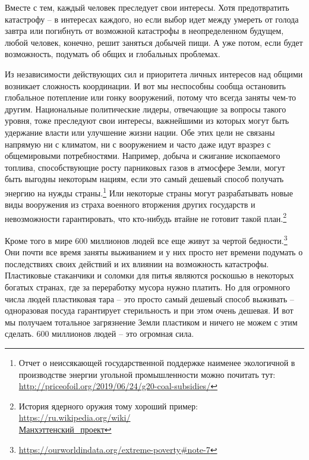 \documentclass[12pt,a4paper]{report}
\begin{document}
\noindent Вместе с тем, каждый человек преследует свои интересы. Хотя предотвратить катастрофу -- в интересах каждого, но если выбор идет между умереть от голода завтра или погибнуть от возможной катастрофы в неопределенном будущем, любой человек, конечно, решит заняться добычей пищи. А уже потом, если будет возможность, подумать об общих и глобальных проблемах.

\noindent Из независимости действующих сил и приоритета личных интересов над общими возникает сложность координации. И вот мы неспособны сообща остановить глобальное потепление или гонку вооружений, потому что всегда заняты чем-то другим. Национальные политические лидеры, отвечающие за вопросы такого уровня, тоже преследуют свои интересы, важнейшими из которых могут быть удержание власти или улучшение жизни нации. Обе этих цели не связаны напрямую ни с климатом, ни с вооружением и часто даже идут вразрез с общемировыми потребностями. Например, добыча и сжигание ископаемого топлива, способствующие росту парниковых газов в атмосфере Земли, могут быть выгодны некоторым нациям, если это самый дешевый способ получать энергию на нужды страны.\footnote{Отчет о неиссякающей государственной поддержке наименее экологичной в производстве энергии угольной промышленности можно почитать тут: \url{http://priceofoil.org/2019/06/24/g20-coal-subsidies/}} Или некоторые страны могут разрабатывать новые виды вооружения из страха военного вторжения других государств и невозможности гарантировать, что кто-нибудь втайне не готовит такой план.\footnote{История ядерного оружия тому хороший пример: \href{https://ru.wikipedia.org/wiki/\%D0\%9C\%D0\%B0\%D0\%BD\%D1\%85\%D1\%8D\%D1\%82\%D1\%82\%D0\%B5\%D0\%BD\%D1\%81\%D0\%BA\%D0\%B8\%D0\%B9_\%D0\%BF\%D1\%80\%D0\%BE\%D0\%B5\%D0\%BA\%D1\%82}{https://ru.wikipedia.org/wiki/\\Манхэттенский\_проект}}

\noindent Кроме того в мире 600 миллионов людей все еще живут за чертой бедности.\footnote{\url{https://ourworldindata.org/extreme-poverty\#note-7}} Они почти все время заняты выживанием и у них просто нет времени подумать о последствиях своих действий и их влиянии на возможность катастрофы. Пластиковые стаканчики и соломки для питья являются роскошью в некоторых богатых странах, где за переработку мусора нужно платить. Но для огромного числа людей пластиковая тара -- это просто самый дешевый способ выживать -- одноразовая посуда гарантирует стерильность и при этом очень дешевая. И вот мы получаем тотальное загрязнение Земли пластиком и ничего не можем с этим сделать. 600 миллионов людей -- это огромная сила.
\end{document}
